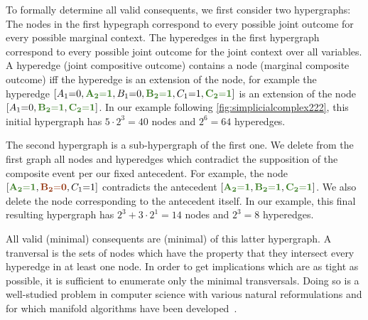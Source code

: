 To formally determine all valid consequents, we first consider two hypergraphs: %
The nodes in the first hypegraph correspond to every possible joint outcome for every possible marginal context.
The hyperedges in the first hypergraph correspond to every possible joint outcome for the joint context over all variables. A hyperedge (joint compositive outcome) contains a node (marginal composite outcome) iff the hyperedge is an extension of the node, for example the hyperedge $\bracks{A_1 \eql 0, \mgreen{A_2 \eql 1}, B_1 \eql 0, \mgreen{B_2 \eql 1}, C_1 \eql 1, \mgreen{C_2 \eql 1}}$ is an extension of the node $\bracks{A_1 \eql 0,  \mgreen{B_2 \eql 1}, \mgreen{C_2 \eql 1}}$. In our example following \cref{fig:simplicialcomplex222}, this initial hypergraph has $5\cdot 2^3 = 40$ nodes and $2^6 = 64$ hyperedges.

The second hypergraph is a sub-hypergraph of the first one. We delete from the first graph all nodes and hyperedges which contradict the supposition of the composite event per our fixed antecedent. For example, the node $\bracks{\mgreen{A_2 \eql 1}, \mred{B_2 \eql 0}, C_1 \eql 1}$ contradicts the antecedent $\bracks{\mgreen{A_2 \eql 1}, \mgreen{B_2 \eql 1}, \mgreen{C_2 \eql 1}}$. We also delete the node corresponding to the antecedent itself. In our example, this final resulting hypergraph has $2^3 + 3\cdot 2^1 = 14$ nodes and $2^3 = 8$ hyperedges.

All valid (minimal) consequents are (minimal)  of this latter hypergraph. A tranversal is the sets of nodes which have the property that they intersect every hyperedge in at least one node. In order to get implications which are as tight as possible, it is sufficient to enumerate only the minimal transversals. Doing so is a well-studied problem in computer science with various natural reformulations and for which manifold algorithms have been developed~\cite{eiter_dualization_2008}.




